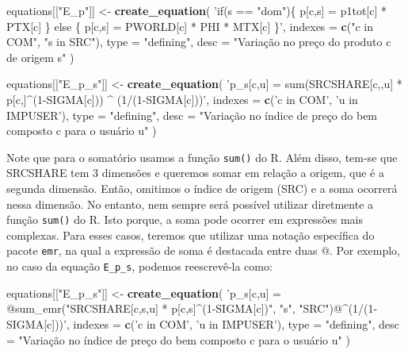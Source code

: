 \documentclass[12pt,twoside]{article}
\newenvironment{Shaded}{\begin{snugshade}}{\end{snugshade}}
\newcommand{\DataTypeTok}[1]{\textcolor[rgb]{0.13,0.29,0.53}{#1}}
\newcommand{\KeywordTok}[1]{\textcolor[rgb]{0.13,0.29,0.53}{\textbf{#1}}}
\newcommand{\NormalTok}[1]{#1}
\newcommand{\StringTok}[1]{\textcolor[rgb]{0.31,0.60,0.02}{#1}}
\let\oldShaded\Shaded
\let\endoldShaded\endShaded
\renewenvironment{Shaded}{\footnotesize\oldShaded}{\endoldShaded}
\begin{document}
\begin{Shaded}
\begin{Highlighting}[]
\NormalTok{equations[[}\StringTok{"E_p"}\NormalTok{]] <-}\StringTok{ }\KeywordTok{create_equation}\NormalTok{(}
  \StringTok{'if(s == "dom")\{}
\StringTok{    p[c,s] = p1tot[c] * PTX[c]}
\StringTok{  \} else \{}
\StringTok{    p[c,s] = PWORLD[c] * PHI * MTX[c]}
\StringTok{  \}'}\NormalTok{,}
  \DataTypeTok{indexes =} \KeywordTok{c}\NormalTok{(}\StringTok{"c in COM"}\NormalTok{, }\StringTok{"s in SRC"}\NormalTok{),}
  \DataTypeTok{type =} \StringTok{"defining"}\NormalTok{,}
  \DataTypeTok{desc =} \StringTok{"Variação no preço do produto c de origem s"}
\NormalTok{)}

\NormalTok{equations[[}\StringTok{"E_p_s"}\NormalTok{]] <-}\StringTok{ }\KeywordTok{create_equation}\NormalTok{(}
  \StringTok{'p_s[c,u] = sum(SRCSHARE[c,,u] * p[c,]^(1-SIGMA[c])) ^ }
\StringTok{    (1/(1-SIGMA[c]))'}\NormalTok{,}
  \DataTypeTok{indexes =} \KeywordTok{c}\NormalTok{(}\StringTok{'c in COM'}\NormalTok{, }\StringTok{'u in IMPUSER'}\NormalTok{),}
  \DataTypeTok{type =} \StringTok{"defining"}\NormalTok{,}
  \DataTypeTok{desc =} \StringTok{"Variação no índice de preço do bem composto c para o usuário u"}
\NormalTok{)}
\end{Highlighting}
\end{Shaded}

Note que para o somatório usamos a função \texttt{sum()} do R. Além
disso, tem-se que SRCSHARE tem 3 dimensões e queremos somar em relação a
origem, que é a segunda dimensão. Então, omitimos o índice de origem
(SRC) e a soma ocorrerá nessa dimensão. No entanto, nem sempre será
possível utilizar diretmente a função \texttt{sum()} do R. Isto porque,
a soma pode ocorrer em expressões mais complexas. Para esses casos,
teremos que utilizar uma notação específica do pacote \texttt{emr}, na
qual a expressão de soma é destacada entre duas @. Por exemplo, no caso
da equação \texttt{E\_p\_s}, podemos reescrevê-la como:

\begin{Shaded}
\begin{Highlighting}[]
\NormalTok{equations[[}\StringTok{"E_p_s"}\NormalTok{]] <-}\StringTok{ }\KeywordTok{create_equation}\NormalTok{(}
  \StringTok{'p_s[c,u] = @sum_emr("SRCSHARE[c,s,u] * p[c,s]^(1-SIGMA[c])", "s", "SRC")@^(1/(1-SIGMA[c]))'}\NormalTok{,}
  \DataTypeTok{indexes =} \KeywordTok{c}\NormalTok{(}\StringTok{'c in COM'}\NormalTok{, }\StringTok{'u in IMPUSER'}\NormalTok{),}
  \DataTypeTok{type =} \StringTok{"defining"}\NormalTok{,}
  \DataTypeTok{desc =} \StringTok{"Variação no índice de preço do bem composto c para o usuário u"}
\NormalTok{)}
\end{Highlighting}
\end{Shaded}
\end{document}
